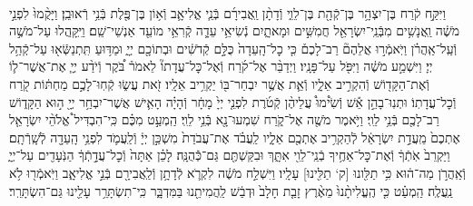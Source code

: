 \documentclass[twoside, openany, parskip=half, 11pt]{book}
\begin{document}
\begin{sometimes}
\begin{footnotesize}
\begin{multicols}{2}
\\
וַיִּקַּ֣ח קֹ֔רַח בֶּן־יִצְהָ֥ר בֶּן־קְֿהָ֖ת בֶּן־לֵוִ֑י וְֿדָתָ֨ן וַֽאֲבִירָ֜ם בְּֿנֵ֧י אֱלִיאָ֛ב וְֿא֥וֹן בֶּן־פֶּ֖לֶת בְּֿנֵ֥י רְֿאוּבֵֽן׃ וַיָּקֻ֨מוּ֙ לִפְנֵ֣י מֹשֶׁ֔ה וַֽאֲנָשִׁ֥ים מִבְּֿנֵֽי־יִשְׂרָאֵ֖ל חֲמִשִּׁ֣ים וּמָאתָ֑יִם נְֿשִׂיאֵ֥י עֵדָ֛ה קְֿרִאֵ֥י מוֹעֵ֖ד אַנְשֵׁי־שֵֽׁם׃ וַיִּֽקָּֽהֲלוּ עַל־מֹשֶׁ֣ה וְֿעַֽל־אַֽהֲרֹ֗ן וַיֹּֽאמְֿר֣וּ אֲלֵהֶם֘ רַב־לָכֶם֒ כִּ֤י כׇל־הָֽעֵדָה֙ כֻּלָּ֣ם קְֿדֹשִׁ֔ים וּבְתוֹכָ֖ם יְיָ֑ וּמַדּ֥וּעַ תִּֽתְנַשְּֿׂא֖וּ עַל־קְֿהַ֥ל יְיָ׃  וַיִּשְׁמַ֣ע מֹשֶׁ֔ה וַיִּפֹּ֖ל עַל־פָּנָֽיו׃ וַיְדַבֵּ֨ר אֶל־קֹ֜רַח וְֿאֶל־כׇּל־עֲדָתוֹ֘ לֵאמֹר֒ בֹּ֠קֶר וְֿיֹדַ֨ע יְיָ֧ אֶת־אֲשֶׁר־ל֛וֹ וְֿאֶת־הַקָּד֖וֹשׁ וְֿהִקְרִ֣יב אֵלָ֑יו וְֿאֵ֛ת אֲשֶׁ֥ר יִבְחַר־בּ֖וֹ יַקְרִ֥יב אֵלָֽיו׃ זֹ֖את עֲשׂ֑וּ קְֿחֽוּ־לָכֶ֣ם מַחְתּ֔וֹת קֹ֖רַח וְֿכׇל־עֲדָתֽוֹ׃ וּתְנֽוּ־בָהֵ֣ן אֵ֡שׁ וְֿשִׂ֩ימוּ֩ עֲלֵיהֶ֨ן קְֿטֹ֜רֶת לִפְנֵ֤י יְיָ֙ מָחָ֔ר וְֿהָיָ֗ה הָאִ֛ישׁ אֲשֶׁר־יִבְחַ֥ר יְיָ֖ ה֣וּא הַקָּד֑וֹשׁ רַב־לָכֶ֖ם בְּֿנֵ֥י לֵוִֽי׃  וַיֹּ֥אמֶר מֹשֶׁ֖ה אֶל־קֹ֑רַח שִׁמְעוּ־נָ֖א בְּֿנֵ֥י לֵוִֽי׃ הַֽמְעַ֣ט מִכֶּ֗ם כִּֽי־הִבְדִּיל֩ אֱלֹהֵ֨י יִשְׂרָאֵ֤ל אֶתְכֶם֙ מֵֽעֲדַ֣ת יִשְׂרָאֵ֔ל לְֿהַקְרִ֥יב אֶתְכֶ֖ם אֵלָ֑יו לַֽעֲבֹ֗ד אֶת־עֲבֹדַת֙ מִשְׁכַּ֣ן יְיָ֔ וְֿלַֽעֲמֹ֛ד לִפְנֵ֥י הָֽעֵדָ֖ה לְֿשָֽׁרְֿתָֽם׃ וַיַּקְרֵב֙ אֹֽתְֿךָ֔ וְֿאֶת־כׇּל־אַחֶ֥יךָ בְֿנֵֽי־לֵוִ֖י אִתָּ֑ךְ וּבִקַּשְׁתֶּ֖ם גַּם־כְּֿֿהֻנָּֽה׃ לָכֵ֗ן אַתָּה֙ וְֿכׇל־עֲדָ֣תְֿךָ֔ הַנֹּֽעָדִ֖ים עַל־יְיָ֑ וְֿאַֽהֲרֹ֣ן מַה־ה֔וּא כִּ֥י תַלִּ֖ונוּ [ק‘ תַלִּ֖ינוּ] עָלָֽיו׃ וַיִּשְׁלַ֣ח מֹשֶׁ֔ה לִקְרֹ֛א לְֿדָתָ֥ן וְֿלַֽאֲבִירָ֖ם בְּֿנֵ֣י אֱלִיאָ֑ב וַיֹּֽאמְֿר֖וּ לֹ֥א נַֽעֲלֶֽה׃ הַֽמְעַ֗ט כִּ֤י הֶֽעֱלִיתָ֨נוּ֙ מֵאֶ֨רֶץ זָבַ֤ת חָלָב֙ וּדְבַ֔שׁ לַֽהֲמִיתֵ֖נוּ בַּמִּדְבָּ֑ר כִּֽי־תִשְׂתָּרֵ֥ר עָלֵ֖ינוּ גַּם־הִשְׂתָּרֵֽר׃


\end{multicols}
\end{footnotesize}
\end{sometimes}
\end{document}
